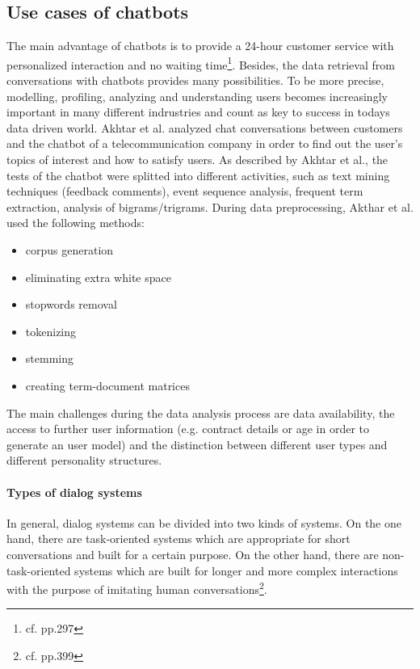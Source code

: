 \subsection{Use cases of chatbots}
The main advantage of chatbots is to provide a 24-hour customer service with personalized interaction and no waiting time\footnote{cf.\autocite{akhtar} pp.297}. 
Besides, the data retrieval from conversations with chatbots provides many possibilities. To be more precise,  modelling, profiling, analyzing and understanding users becomes increasingly important in many different indrustries and count as key to success in todays data driven world. 
Akhtar et al. analyzed chat conversations between customers and the chatbot of a telecommunication company in order to find out the user's topics of interest and how to satisfy users. As described by Akhtar et al., the tests of the chatbot were splitted into different activities, such as text mining techniques (feedback comments), event sequence analysis, frequent term extraction, analysis of bigrams/trigrams. 
During data preprocessing, Akthar et al. used the following methods:
\begin{itemize}
\setlength\itemsep{-0.5em}
  \item[1.] corpus generation
  \item[2.] eliminating extra white space
  \item[3.] stopwords removal
  \item[4.] tokenizing
  \item[5.] stemming
  \item[6.] creating term-document matrices
\end{itemize}

The main challenges during the data analysis process are data availability, the access to further user information (e.g. contract details or age in order to generate an user model) and the distinction between different user types and different personality structures.

\paragraph{Types of dialog systems}
In general, dialog systems can be divided into two kinds of systems. On the one hand, there are task-oriented systems which are appropriate for short conversations and built for a certain purpose. On the other hand, there are non-task-oriented systems which are built for longer and more complex interactions with the purpose of imitating human conversations\footnote{cf.\autocite{akhtar} pp.399}.


